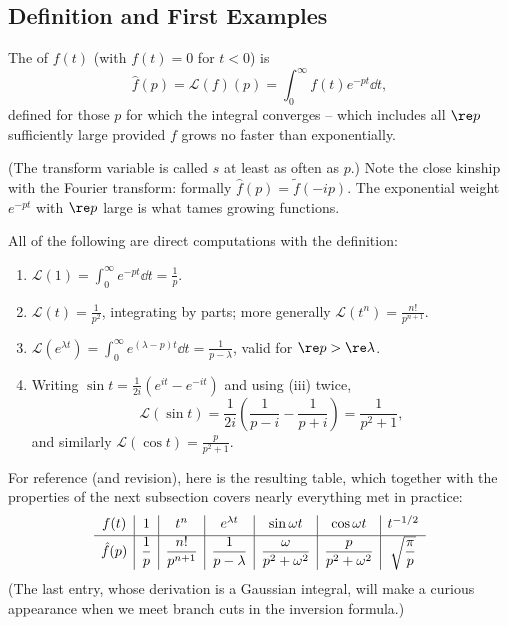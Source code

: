 \subsection{Definition and First Examples}

\begin{definition}
	The  of $f(t)$ (with $f(t) = 0$ for $t < 0$) is
	$$
	\hat f(p) = \mathcal{L}(f)(p) = \int_0^\infty f(t) e^{-pt} \dd t,
	$$
	defined for those $p$ for which the integral converges -- which includes all $\re p$ sufficiently large provided $f$ grows no faster than exponentially.
\end{definition}

(The transform variable is called $s$ at least as often as $p$.) Note the close kinship with the Fourier transform: formally $\hat f(p) = \tilde f(-ip)$. The exponential weight $e^{-pt}$ with $\re p$ large is what tames growing functions.

\begin{example}
	All of the following are direct computations with the definition:
	\begin{enumerate}[label=(\roman*)]
		\item $\displaystyle \mathcal L(1) = \int_0^\infty e^{-pt}\dd t = \frac 1p$.
		\item $\displaystyle \mathcal L(t) = \frac{1}{p^2}$, integrating by parts; more generally $\mathcal L(t^n) = \frac{n!}{p^{n+1}}$.
		\item $\displaystyle \mathcal L(e^{\lambda t}) = \int_0^\infty e^{(\lambda - p)t} \dd t = \frac{1}{p - \lambda}$, valid for $\re p > \re \lambda$.
		\item Writing $\sin t = \frac{1}{2i}(e^{it} - e^{-it})$ and using (iii) twice,
		$$
		\mathcal L (\sin t) = \frac{1}{2i}\left(\frac{1}{p - i} - \frac{1}{p + i}\right) = \frac{1}{p^2 + 1},
		$$
		and similarly $\mathcal L(\cos t) = \frac{p}{p^2 + 1}$.
	\end{enumerate}
\end{example}

For reference (and revision), here is the resulting table, which together with the properties of the next subsection covers nearly everything met in practice:
$$
\begin{array}{c|c|c|c|c|c|c}
	f(t) & 1 & t^n & e^{\lambda t} & \sin \omega t & \cos \omega t & t^{-1/2} \\[2pt]
	\hline
	\rule{0pt}{14pt}\hat f(p) & \dfrac 1p & \dfrac{n!}{p^{n+1}} & \dfrac{1}{p - \lambda} & \dfrac{\omega}{p^2 + \omega^2} & \dfrac{p}{p^2 + \omega^2} & \sqrt{\dfrac{\pi}{p}}
\end{array}
$$
(The last entry, whose derivation is a Gaussian integral, will make a curious appearance when we meet branch cuts in the inversion formula.)

